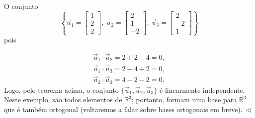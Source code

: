 \begin{ex}
O conjunto
\begin{equation}
\left\lbrace
\vec{u}_1 = \begin{bmatrix}
1 \\ 2 \\ 2
\end{bmatrix}, \
\vec{u}_2 = \begin{bmatrix}
2 \\ 1 \\ -2
\end{bmatrix}, \
\vec{u}_3 = \begin{bmatrix}
2 \\ -2 \\ 1
\end{bmatrix}
\right\rbrace
\end{equation} pois

\begin{equation}
\begin{split}
\vec{u}_1 \cdot \vec{u}_2 = 2 + 2 - 4 = 0, \\
\vec{u}_1 \cdot \vec{u}_3 = 2 - 4 + 2 = 0, \\
\vec{u}_2 \cdot \vec{u}_3 = 4 - 2 - 2 = 0.
\end{split}
\end{equation}
Logo, pelo teorema acima, o conjunto $\{\vec{u}_1, \vec{u}_2,\vec{u}_3\}$ é linearmente independente. Neste exemplo, são todos elementos de $\mathbb{R}^3$; portanto, formam uma base para $\mathbb{R}^3$ que é também ortogonal (voltaremos a falar sobre bases ortogonais em breve)$. \ \lhd$
\end{ex}


